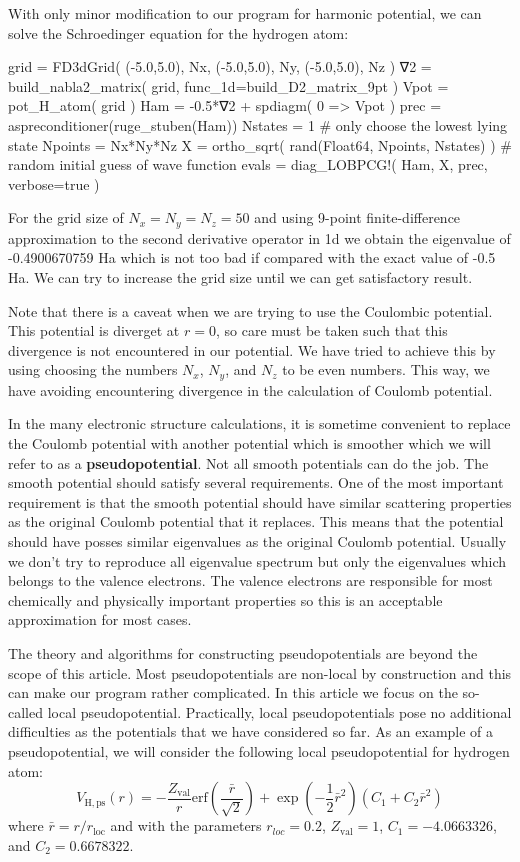 With only minor modification to our program for harmonic potential, we can solve the Schroedinger
equation for the hydrogen atom:
\begin{juliacode}
grid = FD3dGrid( (-5.0,5.0), Nx, (-5.0,5.0), Ny, (-5.0,5.0), Nz )
∇2 = build_nabla2_matrix( grid, func_1d=build_D2_matrix_9pt )
Vpot = pot_H_atom( grid )
Ham = -0.5*∇2 + spdiagm( 0 => Vpot )
prec = aspreconditioner(ruge_stuben(Ham))
Nstates = 1  # only choose the lowest lying state
Npoints = Nx*Ny*Nz
X = ortho_sqrt( rand(Float64, Npoints, Nstates) ) # random initial guess of wave function
evals = diag_LOBPCG!( Ham, X, prec, verbose=true )
\end{juliacode}

For the grid size of $N_{x}=N_{y}=N_{z}=50$ and using 9-point finite-difference approximation
to the second derivative operator in 1d we obtain the eigenvalue of -0.4900670759 Ha which
is not too bad if compared with the exact value of -0.5 Ha. We can try to increase the grid
size until we can get satisfactory result.

Note that there is a caveat when we are trying to use the Coulombic potential. This potential
is diverget at $r=0$, so care must be taken such that this divergence is not encountered in
our potential. We have tried to achieve this by using choosing the numbers
$N_{x}$, $N_{y}$, and $N_{z}$ to be even numbers. This way, we have avoiding encountering
divergence in the calculation of Coulomb potential.

In the many electronic structure calculations, it is sometime convenient to replace the
Coulomb potential with another potential which is smoother which we
will refer to as a \textbf{pseudopotential}. Not all smooth
potentials can do the job. The smooth potential should satisfy several requirements.
One of the most important requirement is that the smooth potential should have similar
scattering properties as the original Coulomb potential that it replaces.
This means that the potential should have posses similar eigenvalues as the
original Coulomb potential. Usually we don't try to reproduce all eigenvalue spectrum but only
the eigenvalues which belongs to the valence electrons. The valence electrons are
responsible for most chemically and physically important properties so this is an
acceptable approximation for most cases.

The theory and algorithms for constructing pseudopotentials are beyond the scope of
this article.
Most pseudopotentials are non-local by construction and this can make our program rather
complicated.
In this article we focus on the so-called local pseudopotential. Practically, local
pseudopotentials pose no additional difficulties as the potentials that we have
considered so far. As an example of a pseudopotential, we will consider the following
local pseudopotential for hydrogen atom:
\begin{equation}
V_{\mathrm{H,ps}}(r) = -\frac{Z_{\mathrm{val}}}{r}
\mathrm{erf}\left( \frac{\bar{r}}{\sqrt{2}} \right) +
\exp\left( -\frac{1}{2}\bar{r}^2 \right)
\left( C_{1} + C_{2}\bar{r}^2 \right)
\end{equation}
where $\bar{r}=r/r_{\mathrm{loc}}$ and with the parameters $r_{loc}=0.2$, 
$Z_{\mathrm{val}}=1$, $C_{1}=-4.0663326$, and $C_{2}=0.6678322$.


